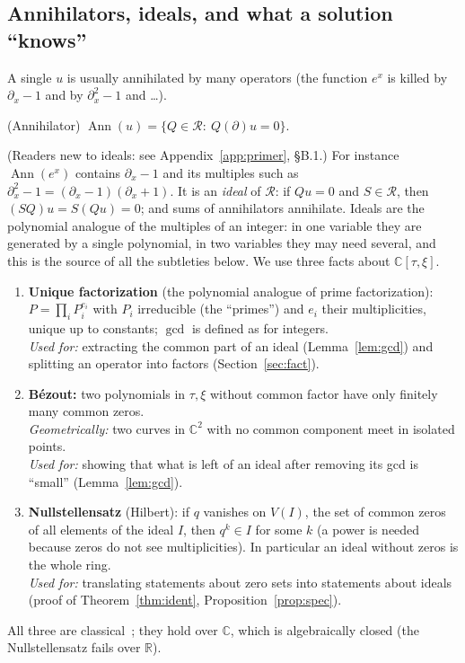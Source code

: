 \documentclass[11pt,a4paper]{article}
\theoremstyle{definition}
\newcommand{\R}{\mathbb{R}}\newcommand{\C}{\mathbb{C}}\newcommand{\N}{\mathbb{N}}\newcommand{\Z}{\mathbb{Z}}
\newcommand{\Ann}{\operatorname{Ann}}
\newcommand{\ring}{\mathcal{R}}
\newcommand{\Var}{V}
\DeclareMathOperator{\Gcd}{gcd}
\begin{document}
\subsection{Annihilators, ideals, and what a solution ``knows''}
A single $u$ is usually annihilated by many operators (the function $e^{x}$ is killed by $\partial_x-1$ and by $\partial_x^2-1$ and \dots).
\begin{definition}{(Annihilator)}\label{def:ann}
$\Ann(u)=\{Q\in\ring:\ Q(\partial)u=0\}$.
\end{definition}
(Readers new to ideals: see Appendix~\ref{app:primer}, \S B.1.) For instance $\Ann(e^{x})$ contains $\partial_x-1$ and its multiples such as $\partial_x^2-1=(\partial_x-1)(\partial_x+1)$. It is an \emph{ideal} of $\ring$: if $Qu=0$ and $S\in\ring$, then $(SQ)u=S(Qu)=0$; and sums of annihilators annihilate. Ideals are the polynomial analogue of the multiples of an integer: in one variable they are generated by a single polynomial, in two variables they may need several, and this is the source of all the subtleties below. We use three facts about $\C[\tau,\xi]$.
\begin{enumerate}[label=(F\arabic*),nosep]
\item \textbf{Unique factorization} (the polynomial analogue of prime factorization): $P=\prod_iP_i^{e_i}$ with $P_i$ irreducible (the ``primes'') and $e_i$ their multiplicities, unique up to constants; $\Gcd$ is defined as for integers. \\[1pt]\emph{Used for:} extracting the common part of an ideal (Lemma~\ref{lem:gcd}) and splitting an operator into factors (Section~\ref{sec:fact}).
\item \textbf{B\'ezout:} two polynomials in $\tau,\xi$ without common factor have only finitely many common zeros. \\[1pt]\emph{Geometrically:} two curves in $\C^2$ with no common component meet in isolated points. \\[1pt]\emph{Used for:} showing that what is left of an ideal after removing its gcd is ``small'' (Lemma~\ref{lem:gcd}).
\item \textbf{Nullstellensatz} (Hilbert): if $q$ vanishes on $\Var(I)$, the set of common zeros of all elements of the ideal $I$, then $q^k\in I$ for some $k$ (a power is needed because zeros do not see multiplicities). In particular an ideal without zeros is the whole ring. \\[1pt]\emph{Used for:} translating statements about zero sets into statements about ideals (proof of Theorem~\ref{thm:ident}, Proposition~\ref{prop:spec}).
\end{enumerate}
All three are classical~\cite{clo,fu}; they hold over $\C$, which is algebraically closed (the Nullstellensatz fails over $\R$).
\end{document}
